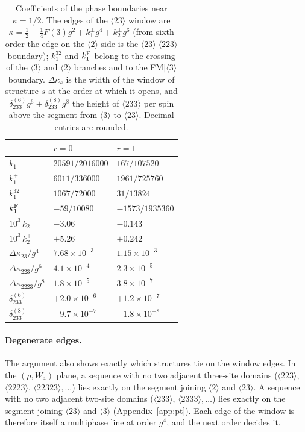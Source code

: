 \documentclass[
 aps,prb,
 twocolumn,
 superscriptaddress,
 longbibliography,
 nofootinbib,
 floatfix
]{revtex4-2}
\begin{document}
\begin{table}
\caption{Coefficients of the phase boundaries near $\kappa=1/2$. The edges of the $\langle23\rangle$ window are
$\kappa=\tfrac12+\tfrac14F(3)g^2+k_1^\pm g^4+k_2^\pm g^6$ (from sixth order the edge on the $\langle2\rangle$
side is the $\langle23\rangle|\langle223\rangle$ boundary); $k_1^{32}$ and $k_1^{\rm F}$ belong to the crossing of the
$\langle3\rangle$ and $\langle2\rangle$ branches and to the FM$|\langle3\rangle$ boundary. $\Delta\kappa_s$ is the width
of the window of structure $s$ at the order at which it opens, and $\delta_{233}^{(6)}g^6+\delta_{233}^{(8)}g^8$ the
height of $\langle233\rangle$ per spin above the segment from $\langle3\rangle$ to $\langle23\rangle$. Decimal entries are rounded.}
\label{tab:bounds}
\begin{ruledtabular}
\begin{tabular}{lll}
 & $r=0$ & $r=1$ \\
\hline
$k_1^-$ & $20591/2016000$ & $167/107520$ \\
$k_1^+$ & $6011/336000$ & $1961/725760$ \\
$k_1^{32}$ & $1067/72000$ & $31/13824$ \\
$k_1^{\rm F}$ & $-59/10080$ & $-1573/1935360$ \\
$10^3\,k_2^-$ & $-3.06$ & $-0.143$ \\
$10^3\,k_2^+$ & $+5.26$ & $+0.242$ \\
$\Delta\kappa_{23}/g^4$ & $7.68\times10^{-3}$ & $1.15\times10^{-3}$ \\
$\Delta\kappa_{223}/g^6$ & $4.1\times10^{-4}$ & $2.3\times10^{-5}$ \\
$\Delta\kappa_{2223}/g^8$ & $1.8\times10^{-5}$ & $3.8\times10^{-7}$ \\
$\delta_{233}^{(6)}$ & $+2.0\times10^{-6}$ & $+1.2\times10^{-7}$ \\
$\delta_{233}^{(8)}$ & $-9.7\times10^{-7}$ & $-1.8\times10^{-8}$ \\
\end{tabular}
\end{ruledtabular}
\end{table}

\paragraph*{Degenerate edges.}
The argument also shows exactly which structures tie on the window edges. In the $(\rho,W_4)$ plane, a
sequence with no two adjacent three-site domains ($\langle223\rangle$, $\langle2223\rangle$,
$\langle22323\rangle,\dots$) lies exactly on the segment joining $\langle2\rangle$ and $\langle23\rangle$. A
sequence with no two adjacent two-site domains ($\langle233\rangle$, $\langle2333\rangle,\dots$) lies exactly on
the segment joining $\langle23\rangle$ and $\langle3\rangle$ (Appendix~\ref{app:pt}).
Each edge of the window is therefore itself a multiphase line at order $g^4$, and the next order decides it.
\end{document}
